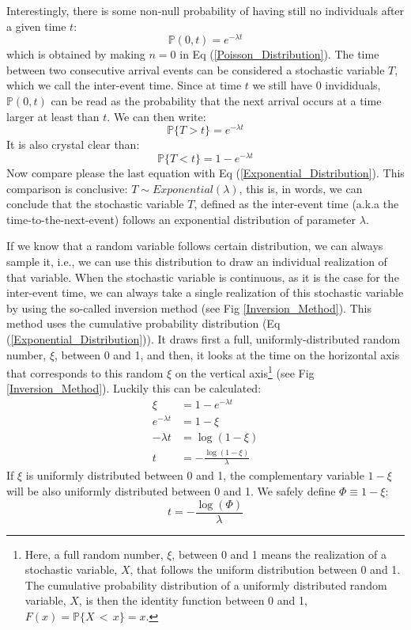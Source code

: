 \documentclass{article}
\newcommand{\Pb}{{\mathbb P}}
\begin{document}
Interestingly, there is some non-null probability of having still no individuals after a given time $t$:
\begin{equation}
\Pb(0, t) =  e^{-\lambda t}
\label{Eq_Exp_1}
\end{equation}
which is obtained by making $n=0$ in Eq (\ref{Poisson_Distribution}). The time between two consecutive arrival events can be considered a stochastic variable $T$, which we call the inter-event time.  Since at time $t$ we still have 0 invididuals, $\Pb(0, t)$ can be read as the probability that the next arrival occurs at a time larger at least than $t$. We can then write:
\begin{equation}
\Pb\{T>t\} =  e^{-\lambda t}
\end{equation}
It is also crystal clear than:
\begin{equation}
\Pb\{T<t\} =  1 - e^{-\lambda t}
\end{equation}
Now compare please the last equation with Eq (\ref{Exponential_Distribution}). This comparison is conclusive: $T \sim Exponential(\lambda)$, this is, in words, we can conclude that the stochastic variable $T$, defined as the inter-event time (a.k.a the time-to-the-next-event) follows an exponential distribution of parameter $\lambda$. 
\smallskip

If we know that a random variable follows certain distribution, we can always sample it, i.e., we can use this distribution to draw an individual realization of that variable. When the stochastic variable is continuous, as it is the case for the inter-event time, we can always take a single realization of this stochastic variable by using the so-called inversion method (see Fig \ref{Inversion_Method}). This method uses the cumulative probability distribution (Eq (\ref{Exponential_Distribution})). It draws first a full, uniformly-distributed random number, $\xi$, between 0 and 1, and then, it looks at the time on the horizontal axis that corresponds to this random $\xi$ on the vertical axis\footnote{Here, a full random number, $\xi$, between 0 and 1 means the realization of a stochastic variable, $X$, that follows the uniform distribution between 0 and 1. The cumulative probability distribution of a uniformly distributed random variable, $X$, is then the identity function between 0 and 1, $F(x) = \Pb\{X\,<\,x\}= x$.}  (see Fig \ref{Inversion_Method}). Luckily this can be calculated:
\begin{align*}
 \xi            &= 1 - e^{-\lambda t}            \\
 e^{-\lambda t} &= 1 - \xi                       \\
 -\lambda t     &= \log(1 - \xi)                 \\
          t     &= -\frac{\log(1 - \xi)}{\lambda}
\end{align*}
If $\xi$ is uniformly distributed between 0 and 1, the complementary variable $1-\xi$ will be also uniformly distributed between 0 and 1. We safely define $\Phi \equiv 1-\xi$:
\begin{equation}
 t     = -\frac{\log(\Phi)}{\lambda}
 \label{Random_Time}
\end{equation}
\end{document}
